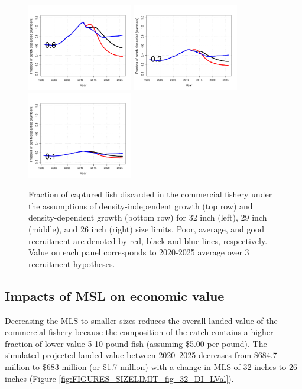 \begin{figure}[htbp]
		\includegraphics[height=1.5in]{../FIGURES/SIZELIMIT/fig_32_DD_dt.pdf}
		\includegraphics[height=1.5in]{../FIGURES/SIZELIMIT/fig_29_DD_dt.pdf}
		\includegraphics[height=1.5in]{../FIGURES/SIZELIMIT/fig_26_DD_dt.pdf}
	\caption{Fraction of captured fish discarded in the commercial fishery under the assumptions of density-independent growth (top row) and density-dependent growth (bottom row) for 32 inch (left), 29 inch (middle), and 26 inch (right) size limits.  Poor, average, and good recruitment are denoted by red, black and blue lines, respectively.  Value on each panel corresponds to 2020-2025 average over 3 recruitment hypotheses.}
	\label{fig:FIGURES_SIZELIMIT_fig_32_DI_dt}
\end{figure}


\subsection{Impacts of MSL on economic value} %
\label{sub:impacts_of_msl_on_economic_value}

Decreasing the MLS to smaller sizes reduces the overall landed value of the commercial fishery because the composition of the catch contains a higher fraction of lower value 5-10 pound fish (assuming \$5.00 per pound).  The simulated projected landed value between 2020--2025 decreases from \$684.7 million to \$683 million  (or \$1.7 million) with a change in MLS of 32 inches to 26 inches (Figure \ref{fig:FIGURES_SIZELIMIT_fig_32_DI_LVal}).

